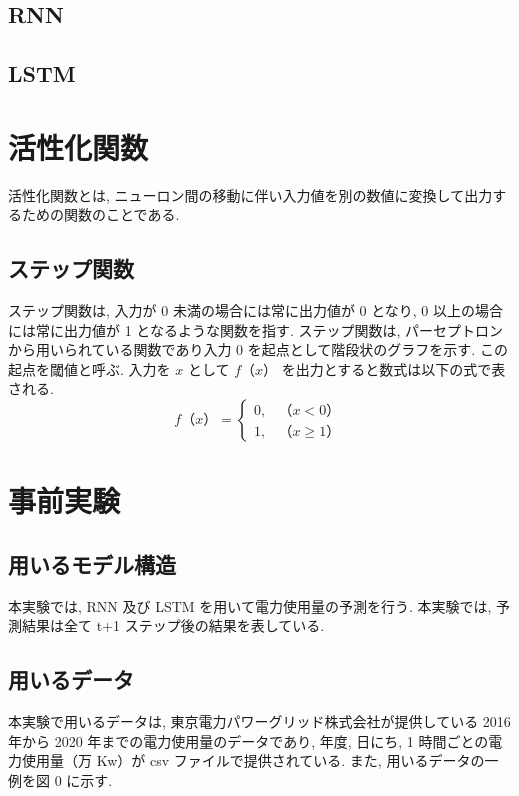 \subsection{RNN}
\subsection{LSTM}

\section{活性化関数}
活性化関数とは, ニューロン間の移動に伴い入力値を別の数値に変換して出力するための関数のことである.
\subsection{ステップ関数}
ステップ関数は, 入力が 0 未満の場合には常に出力値が 0 となり, 0 以上の場合には常に出力値が 1 となるような関数を指す. ステップ関数は, パーセプトロンから用いられている関数であり入力 0 を起点として階段状のグラフを示す. この起点を閾値と呼ぶ. 入力を $x$ として $f（x）$ を出力とすると数式は以下の式で表される.
\begin{equation}
f（x）= \begin{cases}
0, & （x < 0）\\
1, & （x \geq 1）
\end{cases}
\end{equation}

\section{事前実験}
\subsection{用いるモデル構造}
本実験では, RNN 及び LSTM を用いて電力使用量の予測を行う. 本実験では, 予測結果は全て t+1 ステップ後の結果を表している. 
\subsection{用いるデータ}
本実験で用いるデータは, 東京電力パワーグリッド株式会社が提供している 2016 年から 2020 年までの電力使用量のデータであり, 年度, 日にち, 1 時間ごとの電力使用量（万 Kw）が csv ファイルで提供されている. また, 用いるデータの一例を図 0 に示す.

